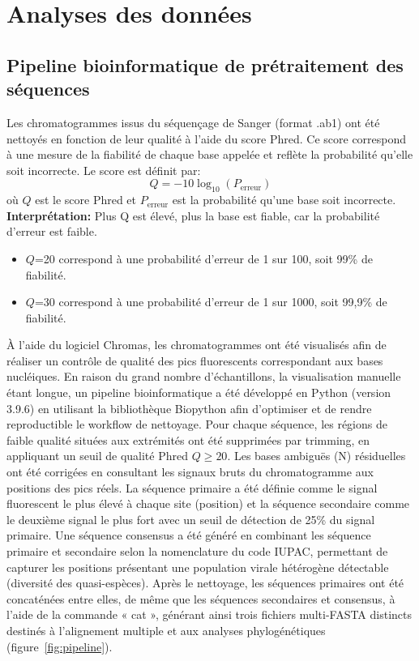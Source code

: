 \documentclass[a4paper,12pt]{article}
\begin{document}
\section{Analyses des données}
\label{sec:analyse}

\subsection{Pipeline bioinformatique de prétraitement des séquences }

Les chromatogrammes issus du séquençage de Sanger (format .ab1) ont été nettoyés en fonction de leur qualité à l’aide du score Phred. Ce score correspond à une mesure de la fiabilité de chaque base appelée et reflète la probabilité qu’elle soit incorrecte. Le score est définit par:
\[
Q = -10 \log_{10}\left(P_{\mathrm{erreur}}\right)
\]
où $Q$ est le score Phred et $P_{\mathrm{erreur}}$ est la probabilité qu'une base soit incorrecte. \\
\textbf{Interprétation: }
Plus Q est élevé, plus la base est fiable, car la probabilité d’erreur est faible.\\
\begin {itemize}
\item $Q$=20 correspond à une probabilité d’erreur de 1 sur 100, soit 99\% de fiabilité.
\item  $Q$=30 correspond à une probabilité d’erreur de 1 sur 1000, soit 99,9\% de fiabilité. \\
\end {itemize}
À l’aide du logiciel Chromas, les chromatogrammes ont été visualisés afin de réaliser un contrôle de qualité des pics fluorescents correspondant aux bases nucléiques. En raison du grand nombre d’échantillons, la visualisation manuelle étant longue, un pipeline bioinformatique a été développé en Python (version 3.9.6) en utilisant la bibliothèque Biopython afin d’optimiser et de rendre reproductible le workflow de nettoyage. 
Pour chaque séquence, les régions de faible qualité situées aux extrémités ont été supprimées par trimming, en appliquant un seuil de qualité Phred $Q \ge 20$. Les bases ambiguës (N) résiduelles ont été corrigées en consultant les signaux bruts du chromatogramme aux positions des pics réels.  La séquence primaire a été définie comme le signal fluorescent le plus élevé à chaque site (position) et la séquence secondaire comme le deuxième signal le plus fort avec un seuil de détection de 25\% du signal primaire. Une séquence consensus a été généré en combinant les séquence primaire et secondaire selon la nomenclature du code IUPAC, permettant de capturer les positions présentant une population virale hétérogène détectable (diversité des quasi-espèces). Après le nettoyage, les séquences primaires ont été concaténées entre elles, de même que les séquences secondaires et consensus, à l’aide de la commande « cat », générant ainsi trois fichiers multi-FASTA distincts destinés à l’alignement multiple et aux analyses phylogénétiques (figure~\ref{fig:pipeline}).
\end{document}
